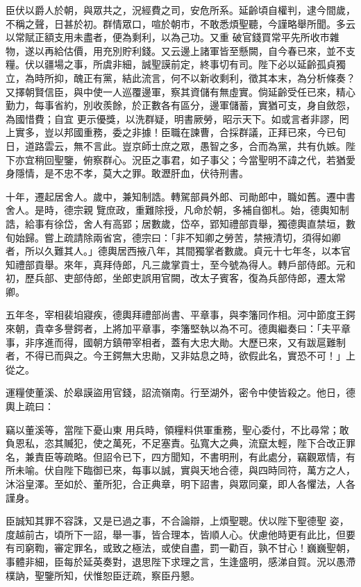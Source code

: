 \begin{pinyinscope}
 臣伏以爵人於朝，與眾共之，況經費之司，安危所系。延齡頃自權判，逮今間歲，不稱之聲，日甚於初。群情眾口，喧於朝市，不敢悉煩聖聽，今謹略舉所聞。多云以常賦正額支用未盡者，便為剩利，以為己功。又重
 破官錢買常平先所收市雜物，遂以再給估價，用充別貯利錢。又云邊上諸軍皆至懸闕，自今春已來，並不支糧。伏以疆場之事，所虞非細，誠聖謨前定，終事切有司。陛下必以延齡孤貞獨立，為時所抑，醜正有黨，結此流言，何不以新收剩利，徵其本末，為分析條奏？又擇朝賢信臣，與中使一人巡覆邊軍，察其資儲有無虛實。倘延齡受任已來，精心勤力，每事省約，別收羨餘，於正數各有區分，邊軍儲蓄，實猶可支，身自斂怨，為國惜費；自宜
 更示優獎，以洗群疑，明書厥勞，昭示天下。如或言者非謬，罔上實多，豈以邦國重務，委之非據！臣職在諫曹，合採群議，正拜已來，今已旬日，道路雲云，無不言此。豈京師士庶之眾，愚智之多，合而為黨，共有仇嫉。陛下亦宜稍回聖鑒，俯察群心。況臣之事君，如子事父；今當聖明不諱之代，若猶愛身隱情，是不忠不孝，莫大之罪。敢瀝肝血，伏待刑書。



 十年，遷起居舍人。歲中，兼知制誥。轉駕部員外郎、司勛郎中，職如舊。遷中書舍人。是時，德宗親
 覽庶政，重難除授，凡命於朝，多補自御札。始，德輿知制誥，給事有徐岱，舍人有高郢；居數歲，岱卒，郢知禮部貢舉，獨德輿直禁垣，數旬始歸。嘗上疏請除兩省宮，德宗曰：「非不知卿之勞苦，禁掖清切，須得如卿者，所以久難其人。」德輿居西掖八年，其間獨掌者數歲。貞元十七年冬，以本官知禮部貢舉。來年，真拜侍郎，凡三歲掌貢士，至今號為得人。轉戶部侍郎。元和初，歷兵部、吏部侍郎，坐郎吏誤用官闕，改太子賓客，復為兵部侍郎，遷太常
 卿。



 五年冬，宰相裴垍寢疾，德輿拜禮部尚書、平章事，與李籓同作相。河中節度王鍔來朝，貴幸多譽鍔者，上將加平章事，李籓堅執以為不可。德輿繼奏曰：「夫平章事，非序進而得，國朝方鎮帶宰相者，蓋有大忠大勛。大歷已來，又有跋扈難制者，不得已而與之。今王鍔無大忠勛，又非姑息之時，欲假此名，實恐不可！」上從之。



 運糧使董溪、於皋謨盜用官錢，詔流嶺南。行至湖外，密令中使皆殺之。他日，德輿上疏曰：



 竊以董溪等，當陛下憂山東
 用兵時，領糧料供軍重務，聖心委付，不比尋常；敢負恩私，恣其贓犯，使之萬死，不足塞責。弘寬大之典，流竄太輕，陛下合改正罪名，兼責臣等疏略。但詔令已下，四方聞知，不書明刑，有此處分，竊觀眾情，有所未喻。伏自陛下臨御已來，每事以誠，實與天地合德，與四時同符，萬方之人，沐浴皇澤。至如於、董所犯，合正典章，明下詔書，與眾同棄，即人各懼法，人各謹身。



 臣誠知其罪不容誅，又是已過之事，不合論辯，上煩聖聰。伏以陛下聖德聖
 姿，度越前古，頃所下一詔，舉一事，皆合理本，皆順人心。伏慮他時更有此比，但要有司窮鞫，審定罪名，或致之極法，或使自盡，罰一勸百，孰不甘心！巍巍聖朝，事體非細，臣每於延英奏對，退思陛下求理之言，生逢盛明，感涕自賀。況以愚滯樸訥，聖鑒所知，伏惟恕臣迂疏，察臣丹懇。




\end{pinyinscope}
